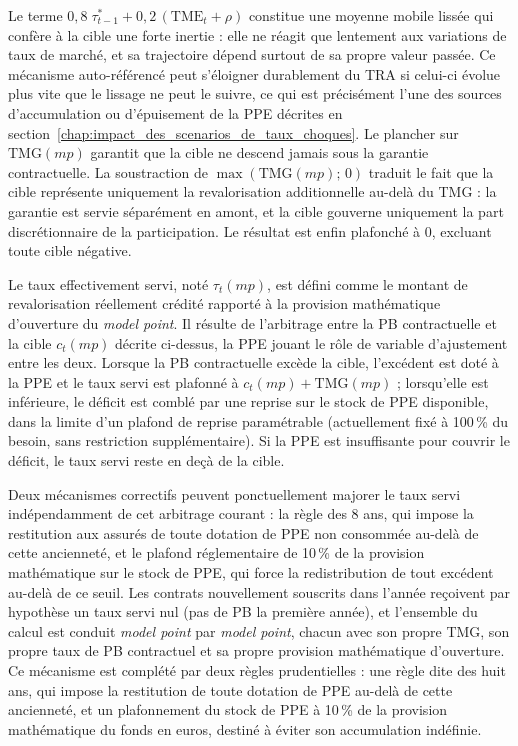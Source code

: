 Le terme $0{,}8\;\tau^*_{t-1} + 0{,}2\,(\text{TME}_t + \rho)$ constitue une moyenne mobile lissée qui confère à la cible une forte inertie : elle ne réagit que lentement aux variations de taux de marché, et sa trajectoire dépend surtout de sa propre valeur passée. Ce mécanisme auto-référencé peut s'éloigner durablement du TRA si celui-ci évolue plus vite que le lissage ne peut le suivre, ce qui est précisément l'une des sources d'accumulation ou d'épuisement de la PPE décrites en section~\ref{chap:impact_des_scenarios_de_taux_choques}. Le plancher sur $\text{TMG}(mp)$ garantit que la cible ne descend jamais sous la garantie contractuelle. La soustraction de $\max(\text{TMG}(mp);\,0)$ traduit le fait que la cible représente uniquement la revalorisation additionnelle au-delà du TMG : la garantie est servie séparément en amont, et la cible gouverne uniquement la part discrétionnaire de la participation. Le résultat est enfin plafonché à 0, excluant toute cible négative.

Le taux effectivement servi, noté $\tau_t(mp)$, est défini comme le montant de revalorisation réellement crédité rapporté à la provision mathématique d'ouverture du \textit{model point}. Il résulte de l'arbitrage entre la PB contractuelle et la cible $c_t(mp)$ décrite ci-dessus, la PPE jouant le rôle de variable d'ajustement entre les deux. Lorsque la PB contractuelle excède la cible, l'excédent est doté à la PPE et le taux servi est plafonné à $c_t(mp) + \text{TMG}(mp)$ ; lorsqu'elle est inférieure, le déficit est comblé par une reprise sur le stock de PPE disponible, dans la limite d'un plafond de reprise paramétrable (actuellement fixé à 100\,\% du besoin, sans restriction supplémentaire). Si la PPE est insuffisante pour couvrir le déficit, le taux servi reste en deçà de la cible.

Deux mécanismes correctifs peuvent ponctuellement majorer le taux servi indépendamment de cet arbitrage courant : la règle des 8 ans, qui impose la restitution aux assurés de toute dotation de PPE non consommée au-delà de cette ancienneté, et le plafond réglementaire de 10\,\% de la provision mathématique sur le stock de PPE, qui force la redistribution de tout excédent au-delà de ce seuil. Les contrats nouvellement souscrits dans l'année reçoivent par hypothèse un taux servi nul (pas de PB la première année), et l'ensemble du calcul est conduit \textit{model point} par \textit{model point}, chacun avec son propre TMG, son propre taux de PB contractuel et sa propre provision mathématique d'ouverture. Ce mécanisme est complété par deux règles prudentielles : une règle dite des huit ans, qui impose la restitution de toute dotation de PPE au-delà de cette ancienneté, et un plafonnement du stock de PPE à 10\,\% de la provision mathématique du fonds en euros, destiné à éviter son accumulation indéfinie.

